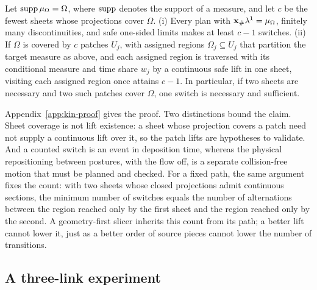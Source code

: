 \begin{proposition}
  \label{prop:sheets-switches}
  Let $\operatorname{supp}\mu_\Omega=\Omega$, where $\operatorname{supp}$ denotes the support of a measure, and let $c$ be the fewest sheets whose projections cover $\Omega$. (i) Every plan with ${\bm{\mathrm{x}}}_\#\lambda^1=\mu_\Omega$, finitely many discontinuities, and safe one-sided limits makes at least $c-1$ switches. (ii) If $\Omega$ is covered by $c$ patches $U_j$, with assigned regions $\Omega_j\subseteq U_j$ that partition the target measure as above, and each assigned region is traversed with its conditional measure and time share $w_j$ by a continuous safe lift in one sheet, visiting each assigned region once attains $c-1$. In particular, if two sheets are necessary and two such patches cover $\Omega$, one switch is necessary and sufficient.
\end{proposition}
Appendix~\ref{app:kin-proof} gives the proof. Two distinctions bound the claim. Sheet coverage is not lift existence: a sheet whose projection covers a patch need not supply a continuous lift over it, so the patch lifts are hypotheses to validate. And a counted switch is an event in deposition time, whereas the physical repositioning between postures, with the flow off, is a separate collision-free motion that must be planned and checked. For a fixed path, the same argument fixes the count: with two sheets whose closed projections admit continuous sections, the minimum number of switches equals the number of alternations between the region reached only by the first sheet and the region reached only by the second. A geometry-first slicer inherits this count from its path; a better lift cannot lower it, just as a better order of source pieces cannot lower the number of transitions.

\subsection{A three-link experiment}
\label{sec:kinematics-example}
